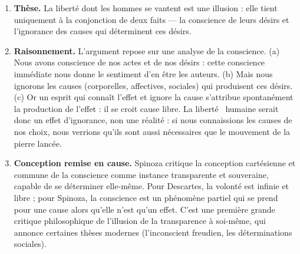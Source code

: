 \documentclass[11pt]{article}
\begin{document}
\begin{corrige}
\begin{enumerate}
\item \textbf{Thèse.} La liberté dont les hommes se vantent est une illusion : elle tient uniquement à la conjonction de deux faits — la conscience de leurs désirs et l'ignorance des causes qui déterminent ces désirs.
\item \textbf{Raisonnement.} L'argument repose sur une analyse de la conscience. (a) Nous avons conscience de nos actes et de nos désirs : cette conscience immédiate nous donne le sentiment d'en être les auteurs. (b) Mais nous ignorons les causes (corporelles, affectives, sociales) qui produisent ces désirs. (c) Or un esprit qui connaît l'effet et ignore la cause s'attribue spontanément la production de l'effet : il se croit cause libre. La \guillemotleft liberté \guillemotright\ humaine serait donc un effet d'ignorance, non une réalité : si nous connaissions les causes de nos choix, nous verrions qu'ils sont aussi nécessaires que le mouvement de la pierre lancée.
\item \textbf{Conception remise en cause.} Spinoza critique la conception cartésienne et commune de la conscience comme instance transparente et souveraine, capable de se déterminer elle-même. Pour Descartes, la volonté est infinie et libre ; pour Spinoza, la conscience est un phénomène partiel qui se prend pour une cause alors qu'elle n'est qu'un effet. C'est une première grande critique philosophique de l'illusion de la transparence à soi-même, qui annonce certaines thèses modernes (l'inconscient freudien, les déterminations sociales).
\end{enumerate}
\end{corrige}
\end{document}

